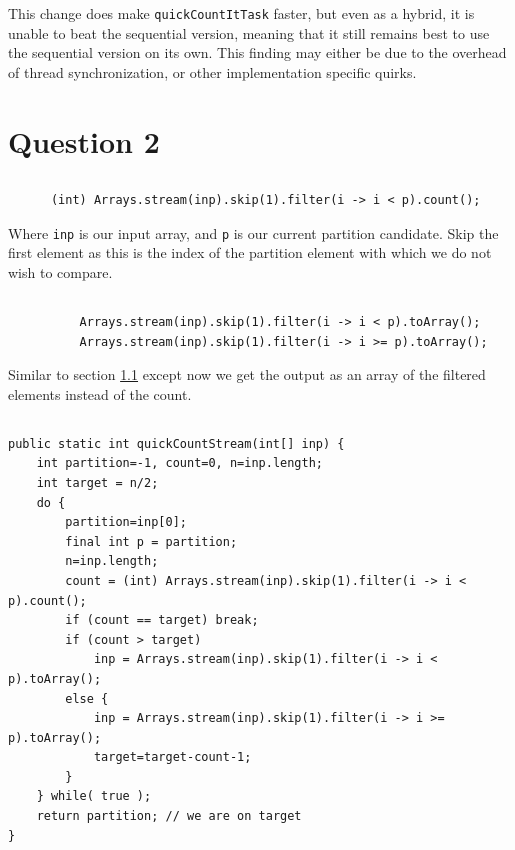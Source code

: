 \documentclass[a5paper]{article}
\begin{document}
This change does make \texttt{quickCountItTask} faster, but even as a hybrid, it is unable to beat the sequential version, meaning that it still remains best to use the sequential version on its own. This finding may either be due to the overhead of thread synchronization, or other implementation specific quirks.

\section{Question 2}
\subsection{}\label{sec:q21}
\begin{lstlisting}
      (int) Arrays.stream(inp).skip(1).filter(i -> i < p).count();
\end{lstlisting}
Where \texttt{inp} is our input array, and \texttt{p} is our current partition candidate.
Skip the first element as this is the index of the partition element with which we do not wish to compare.

\subsection{}
\begin{lstlisting}
          Arrays.stream(inp).skip(1).filter(i -> i < p).toArray();
          Arrays.stream(inp).skip(1).filter(i -> i >= p).toArray();
\end{lstlisting}
Similar to section \ref{sec:q21} except now we get the output as an array of the filtered elements instead of the count.

\subsection{}
\begin{lstlisting}
public static int quickCountStream(int[] inp) {
    int partition=-1, count=0, n=inp.length;
    int target = n/2;
    do {
        partition=inp[0];
        final int p = partition;
        n=inp.length;
        count = (int) Arrays.stream(inp).skip(1).filter(i -> i < p).count();
        if (count == target) break;
        if (count > target)
            inp = Arrays.stream(inp).skip(1).filter(i -> i < p).toArray();
        else {
            inp = Arrays.stream(inp).skip(1).filter(i -> i >= p).toArray();
            target=target-count-1;
        }
    } while( true );
    return partition; // we are on target
}
\end{lstlisting}
\end{document}
